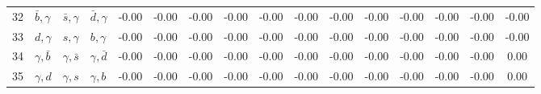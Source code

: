 \begin{tabularx}{\textwidth}{rXXX@{}S@{}S@{}S@{}S@{}S@{}S@{}S@{}S@{}S@{}S@{}S@{}S}
 32 & $\bar b,\gamma$  & $\bar s,\gamma$  & $\bar d,\gamma$ & -0.00 & -0.00 & -0.00 & -0.00 & -0.00 & -0.00 & -0.00 & -0.00 & -0.00 & -0.00 & -0.00 & -0.00 \\
 33 & $d,\gamma$       & $s,\gamma$       & $b,\gamma$      & -0.00 & -0.00 & -0.00 & -0.00 & -0.00 & -0.00 & -0.00 & -0.00 & -0.00 & -0.00 & -0.00 & -0.00 \\
 34 & $\gamma,\bar b$  & $\gamma,\bar s$  & $\gamma,\bar d$ & -0.00 & -0.00 & -0.00 & -0.00 & -0.00 & -0.00 & -0.00 & -0.00 & -0.00 & -0.00 & -0.00 &  0.00 \\
 35 & $\gamma,d$       & $\gamma,s$       & $\gamma, b$     & -0.00 & -0.00 & -0.00 & -0.00 & -0.00 & -0.00 & -0.00 & -0.00 & -0.00 & -0.00 & -0.00 &  0.00 \\
 \bottomrule
\end{tabularx}
